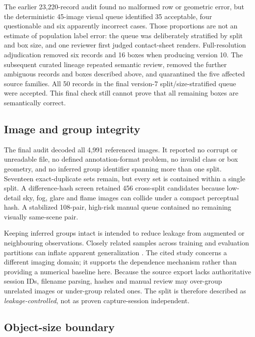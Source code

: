 The earlier 23,220-record audit found no malformed row or geometric error, but
the deterministic 45-image visual queue identified 35 acceptable, four
questionable and six apparently incorrect cases. Those proportions are not an
estimate of population label error: the queue was deliberately stratified by
split and box size, and one reviewer first judged contact-sheet renders.
Full-resolution adjudication removed six records and 16 boxes when producing
version 10. The subsequent curated lineage repeated semantic review, removed
the further ambiguous records and boxes described above, and quarantined the
five affected source families. All 50 records in the final version-7
split/size-stratified queue were accepted. This final check still cannot prove
that all remaining boxes are semantically correct.

\subsection{Image and group integrity}

The final audit decoded all 4,991 referenced images. It reported no corrupt or
unreadable file, no defined annotation-format problem, no invalid class or box
geometry, and no inferred group identifier spanning more than one split.
Seventeen exact-duplicate sets remain, but every set is contained within a
single split. A difference-hash screen retained 456 cross-split candidates
because low-detail sky, fog, glare and flame images can collide under a compact
perceptual hash. A stabilized 108-pair, high-risk manual queue contained no
remaining visually same-scene pair.

Keeping inferred groups intact is intended to reduce leakage from augmented
or neighbouring observations. Closely related samples across training and
evaluation partitions can inflate apparent generalization
\cite{Tampu2022Leakage}. The cited study concerns a different imaging domain;
it supports the dependence mechanism rather than providing a numerical
baseline here. Because the source export lacks authoritative session IDs,
filename parsing, hashes and manual review may over-group unrelated images or
under-group related ones. The split is therefore described as
\emph{leakage-controlled}, not as proven capture-session independent.

\subsection{Object-size boundary}

